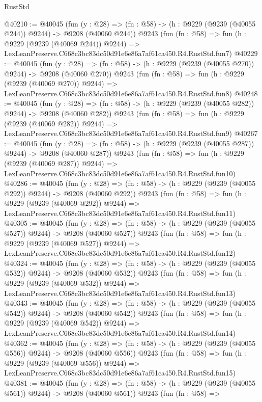 \begin{lexlean}{RustStd}
\begin{coremodule}
@40210 := @40045
    (fun (y : @28) => (fn : @58) -> (h : @9229 (@9239 (@40055 @244)) @9244) -> @9208 (@40060 @244))
    @9243
    (fun (fn : @58) =>
    fun (h : @9229 (@9239 (@40069 @244)) @9244) =>
    LexLeanPreserve.C668c3bc83dc50d91e6e86a7af61ca450.R4.RustStd.fun7)
@40229 := @40045
    (fun (y : @28) => (fn : @58) -> (h : @9229 (@9239 (@40055 @270)) @9244) -> @9208 (@40060 @270))
    @9243
    (fun (fn : @58) =>
    fun (h : @9229 (@9239 (@40069 @270)) @9244) =>
    LexLeanPreserve.C668c3bc83dc50d91e6e86a7af61ca450.R4.RustStd.fun8)
@40248 := @40045
    (fun (y : @28) => (fn : @58) -> (h : @9229 (@9239 (@40055 @282)) @9244) -> @9208 (@40060 @282))
    @9243
    (fun (fn : @58) =>
    fun (h : @9229 (@9239 (@40069 @282)) @9244) =>
    LexLeanPreserve.C668c3bc83dc50d91e6e86a7af61ca450.R4.RustStd.fun9)
@40267 := @40045
    (fun (y : @28) => (fn : @58) -> (h : @9229 (@9239 (@40055 @287)) @9244) -> @9208 (@40060 @287))
    @9243
    (fun (fn : @58) =>
    fun (h : @9229 (@9239 (@40069 @287)) @9244) =>
    LexLeanPreserve.C668c3bc83dc50d91e6e86a7af61ca450.R4.RustStd.fun10)
@40286 := @40045
    (fun (y : @28) => (fn : @58) -> (h : @9229 (@9239 (@40055 @292)) @9244) -> @9208 (@40060 @292))
    @9243
    (fun (fn : @58) =>
    fun (h : @9229 (@9239 (@40069 @292)) @9244) =>
    LexLeanPreserve.C668c3bc83dc50d91e6e86a7af61ca450.R4.RustStd.fun11)
@40305 := @40045
    (fun (y : @28) => (fn : @58) -> (h : @9229 (@9239 (@40055 @527)) @9244) -> @9208 (@40060 @527))
    @9243
    (fun (fn : @58) =>
    fun (h : @9229 (@9239 (@40069 @527)) @9244) =>
    LexLeanPreserve.C668c3bc83dc50d91e6e86a7af61ca450.R4.RustStd.fun12)
@40324 := @40045
    (fun (y : @28) => (fn : @58) -> (h : @9229 (@9239 (@40055 @532)) @9244) -> @9208 (@40060 @532))
    @9243
    (fun (fn : @58) =>
    fun (h : @9229 (@9239 (@40069 @532)) @9244) =>
    LexLeanPreserve.C668c3bc83dc50d91e6e86a7af61ca450.R4.RustStd.fun13)
@40343 := @40045
    (fun (y : @28) => (fn : @58) -> (h : @9229 (@9239 (@40055 @542)) @9244) -> @9208 (@40060 @542))
    @9243
    (fun (fn : @58) =>
    fun (h : @9229 (@9239 (@40069 @542)) @9244) =>
    LexLeanPreserve.C668c3bc83dc50d91e6e86a7af61ca450.R4.RustStd.fun14)
@40362 := @40045
    (fun (y : @28) => (fn : @58) -> (h : @9229 (@9239 (@40055 @556)) @9244) -> @9208 (@40060 @556))
    @9243
    (fun (fn : @58) =>
    fun (h : @9229 (@9239 (@40069 @556)) @9244) =>
    LexLeanPreserve.C668c3bc83dc50d91e6e86a7af61ca450.R4.RustStd.fun15)
@40381 := @40045
    (fun (y : @28) => (fn : @58) -> (h : @9229 (@9239 (@40055 @561)) @9244) -> @9208 (@40060 @561))
    @9243
    (fun (fn : @58) =>

\end{coremodule}
\end{lexlean}
